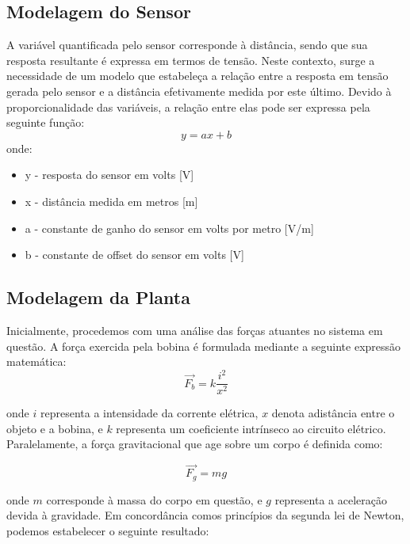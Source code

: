 \documentclass{ifacconf}
\begin{document}
\subsection{Modelagem do Sensor}

A variável quantificada pelo sensor corresponde à distância,
sendo que sua resposta resultante é expressa em termos de tensão.
Neste contexto, surge a necessidade de um modelo que estabeleça a
relação entre a resposta em tensão gerada pelo sensor e a distância
efetivamente medida por este último. Devido à proporcionalidade
das variáveis, a relação entre elas pode ser expressa pela seguinte
função:
\begin{equation}
    y = ax + b
\end{equation}
onde:
\begin{itemize}
    \item y - resposta do sensor em volts [V]
    \item x - distância medida em metros [m]
    \item a - constante de ganho do sensor em volts por metro [V/m]
    \item b - constante de offset do sensor em volts [V]
\end{itemize}

\subsection{Modelagem da Planta}

Inicialmente, procedemos com uma análise das forças atuantes
no sistema em questão. A força exercida pela bobina é formulada
mediante a seguinte expressão matemática:
\begin{equation}
    \vec{F_b} = k \frac{i^2}{x^2}
\end{equation}

\noindent onde $i$ representa a intensidade da corrente elétrica, $x$ denota adistância entre o objeto e a bobina, e $k$ representa um coeficiente intrínseco ao circuito elétrico. Paralelamente, a força gravitacional que age sobre um corpo é definida como:

\begin{equation}
    \vec{F_g} = mg
\end{equation}

\noindent onde $m$ corresponde à massa do corpo em questão, e $g$ representa a aceleração devida à gravidade. Em concordância comos princípios da segunda lei de Newton, podemos estabelecer o
seguinte resultado:
\end{document}
